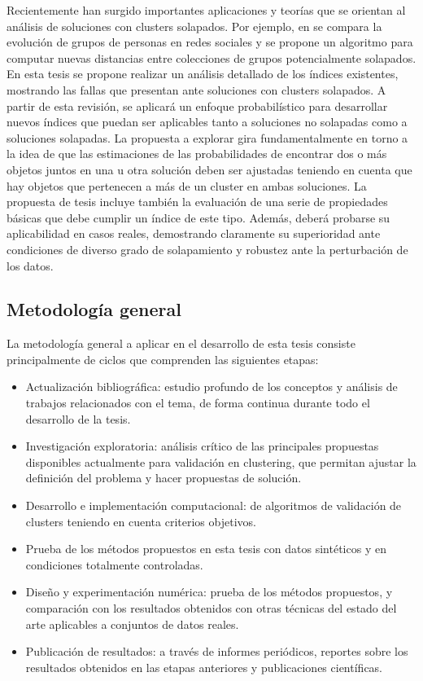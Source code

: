 \documentclass[a4paper,8pt]{article}
\begin{document}
Recientemente han surgido importantes aplicaciones y teorías que se orientan al análisis de soluciones con clusters solapados. Por ejemplo, en \cite{GoldbergHM10} se compara la evolución de grupos de personas en redes sociales y se propone un algoritmo para computar nuevas distancias entre colecciones de grupos potencialmente solapados. En esta tesis se propone realizar un análisis detallado de los índices existentes, mostrando las fallas que presentan ante soluciones con clusters solapados. A partir de esta revisión, se aplicará un enfoque probabilístico para desarrollar nuevos índices que puedan ser aplicables tanto a soluciones no solapadas como a soluciones solapadas. La propuesta a explorar gira fundamentalmente en torno a la idea de que las estimaciones de las probabilidades de encontrar dos o más objetos juntos en una u otra solución deben ser ajustadas teniendo en cuenta que hay objetos que pertenecen a más de un cluster en ambas soluciones. La propuesta de tesis incluye también la evaluación de una serie de propiedades básicas que debe cumplir un índice de este tipo. Además, deberá probarse su aplicabilidad en casos reales, demostrando claramente su superioridad ante condiciones de diverso grado de solapamiento y robustez ante la perturbación de los datos.

\subsection{Metodología general}
La metodología general a aplicar en el desarrollo de esta tesis consiste principalmente de ciclos que comprenden las siguientes etapas:
\begin{itemize}
	\item Actualización bibliográfica: estudio profundo de los conceptos y análisis de trabajos relacionados con el tema, de forma continua durante todo el desarrollo de la tesis. 
	\item Investigación exploratoria: análisis crítico de las principales propuestas disponibles actualmente para validación en clustering, que permitan ajustar la definición del problema y hacer propuestas de solución.
	\item Desarrollo e implementación computacional: de algoritmos de validación de clusters teniendo en cuenta criterios objetivos.
	\item Prueba de los métodos propuestos en esta tesis con datos sintéticos y en condiciones totalmente controladas.
	\item Diseño y experimentación numérica: prueba de los métodos propuestos, y comparación con los resultados obtenidos con otras técnicas del estado del arte aplicables a conjuntos de datos reales. 
	\item Publicación de resultados: a través de informes periódicos, reportes sobre los resultados obtenidos en las etapas anteriores y publicaciones científicas.
\end{itemize}
\end{document}
